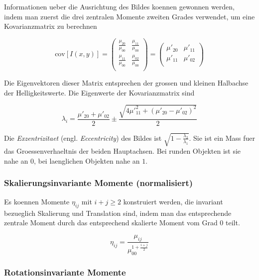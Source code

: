 Informationen ueber die Ausrichtung des Bildes koennen gewonnen werden, indem man zuerst die drei zentralen Momente zweiten Grades verwendet, um eine Kovarianzmatrix zu berechnen

\begin{equation}
  \text{cov}[I(x,y)] = \begin{pmatrix}
    \frac{\mu_{20}}{\mu_{00}} & \frac{\mu_{11}}{\mu_{00}}\\
    \frac{\mu_{11}}{\mu_{00}} & \frac{\mu_{02}}{\mu_{00}}\\
  \end{pmatrix} = \begin{pmatrix}
    \mu'_{20} & \mu'_{11}\\
    \mu'_{11} & \mu'_{02}\\
  \end{pmatrix}
\end{equation}

Die Eigenvektoren dieser Matrix entsprechen der grossen und kleinen Halbachse der Helligkeitswerte.
Die Eigenwerte der Kovarianzmatrix sind

\begin{equation}
  \lambda_i = \frac{\mu'_{20} + \mu'_{02}}{2} \pm \frac{\sqrt{4 \mu'^2_{11} + (\mu'_{20} - \mu'_{02})^2}}{2}
\end{equation}

Die \emph{Exzentrizitaet} (engl. \emph{Eccentricity}) des Bildes ist $\sqrt{1 - \frac{\lambda_2}{\lambda_1}}$.
Sie ist ein Mass fuer das Groessenverhaeltnis der beiden Hauptachsen.
Bei runden Objekten ist sie nahe an $0$, bei laenglichen Objekten nahe an $1$.

\subsubsection{Skalierungsinvariante Momente (normalisiert)}

Es koennen Momente $\eta_{ij}$ mit $i + j \geq 2$ konstruiert werden, die invariant bezueglich Skalierung und Translation sind, indem man das entsprechende zentrale Moment durch das entsprechend skalierte Moment vom Grad $0$ teilt.

\begin{equation}
  \eta_{ij} = \frac{\mu_{ij}}{\mu_{00}^{1 + \frac{i + j}{2}}}
\end{equation}

\subsubsection{Rotationsinvariante Momente}

